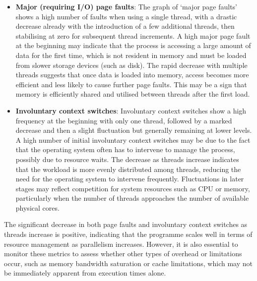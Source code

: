 \documentclass[
]{article}
\begin{document}
\begin{itemize}
\item
  \textbf{Major (requiring I/O) page faults}: The graph of `major page
  faults' shows a high number of faults when using a single thread, with
  a drastic decrease already with the introduction of a few additional
  threads, then stabilising at zero for subsequent thread increments. A
  high major page fault at the beginning may indicate that the process
  is accessing a large amount of data for the first time, which is not
  resident in memory and must be loaded from slower storage devices
  (such as disk). The rapid decrease with multiple threads suggests that
  once data is loaded into memory, access becomes more efficient and
  less likely to cause further page faults. This may be a sign that
  memory is efficiently shared and utilised between threads after the
  first load.
\item
  \textbf{Involuntary context switches}: Involuntary context switches
  show a high frequency at the beginning with only one thread, followed
  by a marked decrease and then a slight fluctuation but generally
  remaining at lower levels. A high number of initial involuntary
  context switches may be due to the fact that the operating system
  often has to intervene to manage the process, possibly due to resource
  waits. The decrease as threads increase indicates that the workload is
  more evenly distributed among threads, reducing the need for the
  operating system to intervene frequently. Fluctuations in later stages
  may reflect competition for system resources such as CPU or memory,
  particularly when the number of threads approaches the number of
  available physical cores.
\end{itemize}

The significant decrease in both page faults and involuntary context
switches as threads increase is positive, indicating that the programme
scales well in terms of resource management as parallelism increases.
However, it is also essential to monitor these metrics to assess whether
other types of overhead or limitations occur, such as memory bandwidth
saturation or cache limitations, which may not be immediately apparent
from execution times alone.
\end{document}
